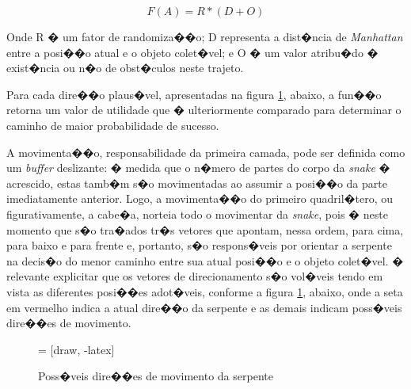 \documentclass[12pt]{article}
\begin{document}
\begin{equation}
F(A) = R * (D + O)
\end{equation}

Onde R � um fator de randomiza��o; D representa a dist�ncia de \textit{Manhattan} entre a posi��o atual e o objeto colet�vel; e O � um valor atribu�do � exist�ncia ou n�o de obst�culos neste trajeto.

Para cada dire��o plaus�vel, apresentadas na figura \ref{fig:snakeHeadPositions}, abaixo, a fun��o retorna um valor de utilidade que � ulteriormente comparado para determinar o caminho de maior probabilidade de sucesso.

A movimenta��o, responsabilidade da primeira camada, pode ser definida como um \textit{buffer} deslizante: � medida que o n�mero de partes do corpo da \textit{snake} � acrescido, estas tamb�m s�o movimentadas ao assumir a posi��o da parte imediatamente anterior. Logo, a movimenta��o do primeiro quadril�tero, ou figurativamente, a cabe�a, norteia todo o movimentar da \textit{snake}, pois � neste momento que s�o tra�ados tr�s vetores que apontam, nessa ordem, para cima, para baixo e para frente e, portanto, s�o respons�veis por orientar a serpente na decis�o do menor caminho entre sua atual posi��o e o objeto colet�vel. � relevante explicitar que os vetores de direcionamento s�o vol�veis tendo em vista as diferentes posi��es adot�veis, conforme a figura \ref{fig:snakeHeadPositions}, abaixo, onde a seta em vermelho indica a atual dire��o da serpente e as demais indicam poss�veis dire��es de movimento.

\begin{figure}[H]
\centering
{} = [draw, -latex]

\caption{Poss�veis dire��es de movimento da serpente}
\label{fig:snakeHeadPositions}
\end{figure}
\end{document}
